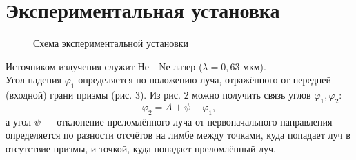 \section*{Экспериментальная установка}
\begin{figure}[h!]
        \noindent{}
        \caption{Схема экспериментальной установки}
    \end{figure}
    Источником излучения служит Не—Nе-лазер
($\lambda = 0,63$ мкм). \\
Угол падения $\varphi_1$ определяется по положению луча, отражённого от передней (входной) грани призмы (рис. 3). Из рис. 2 можно получить
связь углов $\varphi_1, \varphi_2$:
\[\varphi_2 = A + \psi - \varphi_1 ,\]
а угол $\psi$ — отклонение преломлённого луча от первоначального направления — определяется по разности отсчётов на лимбе между точками, куда попадает луч в отсутствие призмы, и точкой, куда попадает преломлённый луч.
